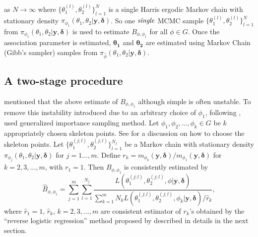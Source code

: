 \documentclass[11pt]{article}
\theoremstyle{remboldstyle}
\newcommand{\y}{{\boldsymbol{y}}}
\newcommand{\de}{{\boldsymbol{\delta}}}
\begin{document}
as $N \rightarrow \infty$ where $\{\theta_1^{(l)}, \theta_2^{(l)}\}_{l=1}^{N}$  is a single Harris ergodic Markov chain with stationary density $\pi_{\phi_1}(\theta_1, \theta_2| \y, \de)$. So one $\it{single}$ MCMC sample $\{\theta_1^{(l)}, \theta_2^{(l)}\}_{l=1}^{N}$ from $\pi_{\phi_1}(\theta_1, \theta_2| \y, \de)$ is used to estimate $B_{\phi,\phi_1}$ for all $\phi \in G$. Once the association parameter is estimated, $\mathbf{\theta_1}$ and $\mathbf{\theta_2}$ are estimated using Markov Chain (Gibb's sampler) samples from $\pi_{\hat{\phi}}(\theta_1, \theta_2| \y, \de)$.
\subsection{A two-stage procedure}
\noindent
\cite{roy:2014} mentioned that the above estimate of $B_{\phi,\phi_1}$ although simple is often unstable. To remove this instability introduced due to an arbitrary choice of $\phi_1$, following \cite{doss:2010}, \cite{roy:2014} used generalized importance sampling method. Let $\phi_1, \phi_2, \dots, \phi_k \in G$ be $k$ appropriately chosen skeleton points. See \cite{roy:zhu:2014} for a discussion on how to choose the skeleton points. Let $\{\theta_1^{(j;l)}, \theta_2^{(j;l)}\}_{l=1}^{N_j}$ be a Markov chain with stationary density $\pi_{\phi_j}(\theta_1, \theta_2| \y, \de)$ for $j=1\dots,m$. Define $r_k = m_{\phi_k}(\y, \de)/ m_{\phi_1}(\y, \de) $ for
$k = 2, 3, \dots, m$, with $r_1=1$. Then $B_{\phi, \phi_1}$ is consistently estimated by
\begin{equation}
  \label{eq:bf2}
   \hat{B}_{\phi, \phi_1} = \sum_{j =1}^m \sum_{l =1}^{N_j} \frac{ L(\theta_1^{(j;l)}, \theta_2^{(j;l)}, \phi| \y, \de)}{\sum_{k =1}^m N_k L(\theta_1^{(j;l)}, \theta_2^{(j;l)}, \phi_k| \y, \de)/ \hat{r}_k},
\end{equation}
where $\hat {r}_1 =1$, $\hat{r}_k$, $k = 2, 3, \dots, m$ are consistent estimator of $r_k$'s obtained by the ``reverse logistic regression'' method proposed by \cite{geyer:1994} described in details in the next section.
\end{document}
